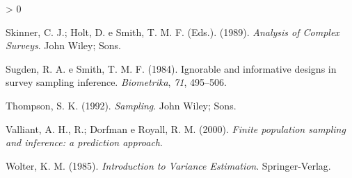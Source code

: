 \documentclass[
  12pt,
  brazilian,
]{book}
\newlength{\cslhangindent}
\newenvironment{CSLReferences}[2] %
 {%
  \setlength{\parindent}{0pt}
  \ifodd #1 \everypar{\setlength{\hangindent}{\cslhangindent}}\ignorespaces\fi
  \ifnum #2 > 0
  \setlength{\parskip}{#2\baselineskip}
  \fi
 }%
 {}
\theoremstyle{definition}
\theoremstyle{definition}
\theoremstyle{definition}
\theoremstyle{definition}
\theoremstyle{remark}
\begin{document}
\begin{CSLReferences}{1}{0}
\leavevmode\hypertarget{ref-SHS89}{}%
Skinner, C. J.; Holt, D. e Smith, T. M. F. (Eds.). (1989). \emph{Analysis of Complex Surveys}. John Wiley; Sons.

\leavevmode\hypertarget{ref-Sugden84}{}%
Sugden, R. A. e Smith, T. M. F. (1984). Ignorable and informative designs in survey sampling inference. \emph{Biometrika}, \emph{71}, 495--506.

\leavevmode\hypertarget{ref-thompson}{}%
Thompson, S. K. (1992). \emph{Sampling}. John Wiley; Sons.

\leavevmode\hypertarget{ref-valliant}{}%
Valliant, A. H., R.; Dorfman e Royall, R. M. (2000). \emph{Finite population sampling and inference: a prediction approach}.

\leavevmode\hypertarget{ref-W85}{}%
Wolter, K. M. (1985). \emph{Introduction to Variance Estimation}. Springer-Verlag.

\end{CSLReferences}
\end{document}
